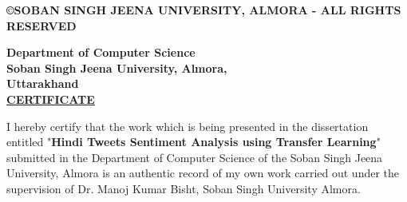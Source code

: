 \documentclass[a4paper, 12pt]{article}
\begin{document}
\begin{sloppypar}
\begin{center}
\vspace*{10cm}
\textbf{\copyright  SOBAN SINGH JEENA UNIVERSITY, ALMORA - ALL RIGHTS RESERVED }
\end{center}
\thispagestyle{empty}
\clearpage


\begin{center}
\Large{\textbf{Department of Computer Science}}\\
\Large{\textbf{Soban Singh Jeena University, Almora,}}\\
\Large{\textbf{Uttarakhand}}\\ [1cm]
\Large{\underline{\textbf{CERTIFICATE}}}\\
\end{center}
I hereby certify that the work which is being presented in the dissertation entitled "\textbf{Hindi Tweets Sentiment Analysis using Transfer Learning}" submitted in the Department of Computer Science of the Soban Singh Jeena University, Almora is an authentic record of my own work carried out under the supervision of Dr. Manoj Kumar Bisht, Soban Singh University Almora.


\end{sloppypar}
\end{document}
